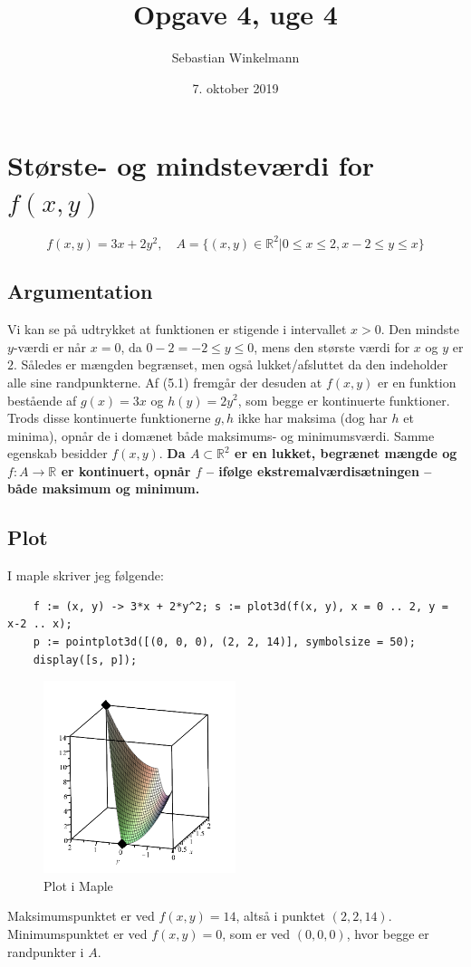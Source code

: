\documentclass{report}
\title{Opgave 4, uge 4}
\author{Sebastian Winkelmann}
\date{7. oktober 2019}
\begin{document}

\setcounter{chapter}{5}
\section{Største- og mindsteværdi for $f(x,y)$}
\begin{equation}
    f(x,y)=3x+2y^2,\quad A=\{(x,y)\in\mathbb{R}^2|0\leq x\leq2, x-2\leq y\leq x\}
\end{equation}
\subsection{Argumentation}
Vi kan se på udtrykket at funktionen er stigende i intervallet $x>0$. Den mindste $y$-værdi er når $x=0$, da $0-2=-2\leq y\leq 0$, mens den største værdi for $x$ og $y$ er $2$. Således er mængden begrænset, men også lukket/afsluttet da den indeholder alle sine randpunkterne. Af (5.1) fremgår der desuden at $f(x,y)$ er en funktion bestående af $g(x)=3x$ og $h(y)=2y^2$, som begge er kontinuerte funktioner. Trods disse kontinuerte funktionerne $g,h$ ikke har maksima (dog har $h$ et minima), opnår de i domænet både maksimums- og minimumsværdi. Samme egenskab besidder $f(x,y)$. \textbf{Da $A\subset \mathbb{R}^2$ er en lukket, begrænet mængde og $f:A\to\mathbb{R}$ er kontinuert, opnår $f$ -- ifølge ekstremalværdisætningen -- både maksimum og minimum.}
\subsection{Plot}
I maple skriver jeg følgende:
\begin{verbatim}
    f := (x, y) -> 3*x + 2*y^2; s := plot3d(f(x, y), x = 0 .. 2, y = x-2 .. x);
    p := pointplot3d([(0, 0, 0), (2, 2, 14)], symbolsize = 50);
    display([s, p]);
\end{verbatim}
\begin{figure}[H]
    \centering
    \includegraphics[width=0.5\textwidth]{51b.png}
    \caption{Plot i Maple}
\end{figure}
Maksimumspunktet er ved $f(x,y)=14$, altså i punktet $(2,2,14)$. Minimumspunktet er ved $f(x,y)=0$, som er ved $(0,0,0)$, hvor begge er randpunkter i $A$.
\end{document}
